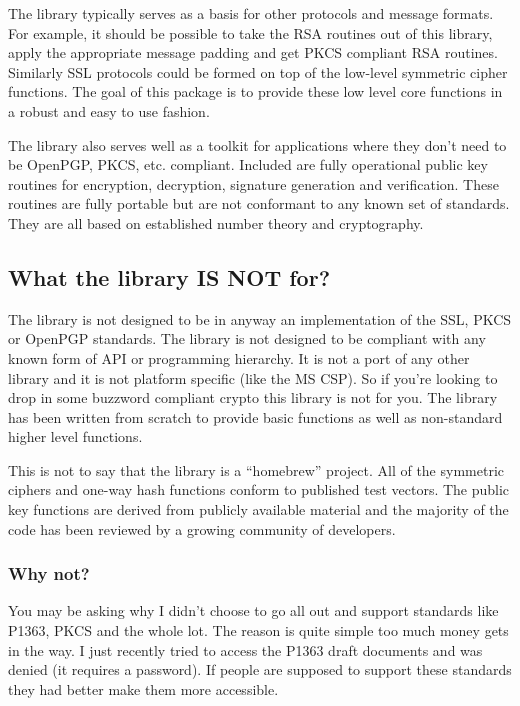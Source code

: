 \documentclass{book}
\begin{document}
The library typically serves as a basis for other protocols and message formats.  For example, it should be possible to 
take the RSA routines out of this library, apply the appropriate message padding and get PKCS compliant RSA routines.  
Similarly SSL protocols could be formed on top  of the low-level symmetric cipher functions.  The goal of this package is 
to provide these low level core functions in a robust and easy to use fashion.

The library also serves well as a toolkit for applications where they don't need to be OpenPGP, PKCS, etc. compliant.
Included are fully operational public key routines for encryption, decryption, signature generation and verification.  
These routines are fully portable but are not conformant to any known set of standards.  They are all based on established
number theory and cryptography.  

\subsection{What the library IS NOT for?}

The library is not designed to be in anyway an implementation of the SSL, PKCS or OpenPGP standards.  The library is not 
designed  to be compliant with any known form of API or programming hierarchy.  It is not a port of any other 
library and it is not platform specific (like the MS CSP).  So if you're looking to drop in some buzzword 
compliant crypto this library is not for you.  The library has been written from scratch to provide basic 
functions as well as non-standard higher level functions.  

This is not to say that the library is a ``homebrew'' project.  All of the symmetric ciphers and one-way hash functions
conform to published test vectors.  The public key functions are derived from publicly available material and the majority
of the code has been reviewed by a growing community of developers.

\subsubsection{Why not?}
You may be asking why I didn't choose to go all out and support standards like P1363, PKCS and the whole lot.  The reason
is quite simple too much money gets in the way.  I just recently tried to access the P1363 draft documents and was denied (it 
requires a password).  If people are supposed to support these standards they had better make them more accessible.
\end{document}
